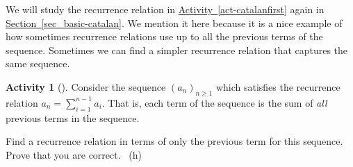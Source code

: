 \documentclass[10pt,]{book}
\theoremstyle{plain}
\theoremstyle{definition}
\theoremstyle{definition}
\theoremstyle{definition}
\newtheorem{activity}[project]{Activity}
\numberwithin{equation}{chapter}
\begin{document}
\hypertarget{p-916}{}%
We will study the recurrence relation in \hyperref[act-catalanfirst]{Activity~\ref{act-catalanfirst}} again in \hyperref[sec_basic-catalan]{Section~\ref{sec_basic-catalan}}.  We mention it here because it is a nice example of how sometimes recurrence relations use up to all the previous terms of the sequence.  Sometimes we can find a simpler recurrence relation that captures the same sequence.%
\begin{activity}[]\label{activity-135}
\hypertarget{p-917}{}%
Consider the sequence \((a_n)_{n \ge 1}\) which satisfies the recurrence relation \(a_n = \sum_{i = 1}^{n-1} a_i\).  That is, each term of the sequence is the sum of \emph{all} previous terms in the sequence.%
\par
\hypertarget{p-918}{}%
Find a recurrence relation in terms of only the previous term for this sequence.  Prove that you are correct.%
~{\tiny (h)}\end{activity}
\typeout{************************************************}
\typeout{************************************************}
\end{document}
